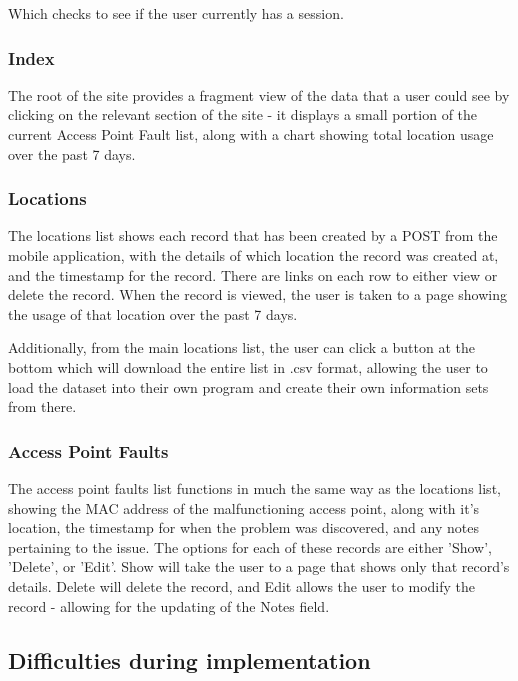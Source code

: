 \documentclass[11pt]{informatics-report}
\begin{document}
Which checks to see if the user currently has a session.

\subsubsection{Index}

The root of the site provides a fragment view of the data that a user could see by clicking on the relevant section of the site - it displays a small portion of the current Access Point Fault list, along with a chart showing total location usage over the past 7 days.

\subsubsection{Locations}

The locations list shows each record that has been created by a POST from the mobile application, with the details of which location the record was created at, and the timestamp for the record. There are links on each row to either view or delete the record. When the record is viewed, the user is taken to a page showing the usage of that location over the past 7 days. 

Additionally, from the main locations list, the user can click a button at the bottom which will download the entire list in .csv format, allowing the user to load the dataset into their own program and create their own information sets from there.

\subsubsection{Access Point Faults}

The access point faults list functions in much the same way as the locations list, showing the MAC address of the malfunctioning access point, along with it's location, the timestamp for when the problem was discovered, and any notes pertaining to the issue. The options for each of these records are either 'Show', 'Delete', or 'Edit'. Show will take the user to a page that shows only that record's details. Delete will delete the record, and Edit allows the user to modify the record - allowing for the updating of the Notes field. 

\subsection{Difficulties during implementation}
\end{document}

